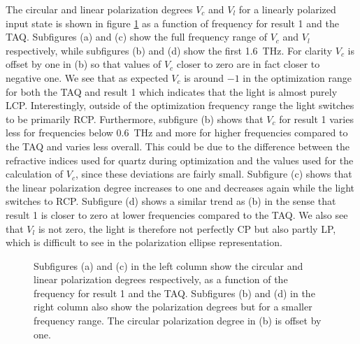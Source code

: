 The circular and linear polarization degrees $V_c$ and $V_l$ for a linearly polarized input state is shown in figure \ref{fig:cl4_pol_deg} as a function of frequency for result 1 and the TAQ. Subfigures (a) and (c) show the full frequency range of $V_c$ and $V_l$ respectively, while subfigures (b) and (d) show the first \SI{1.6}{\tera \hertz}. For clarity $V_c$ is offset by one in (b) so that values of $V_c$ closer to zero are in fact closer to negative one. We see that as expected $V_c$ is around $-1$ in the optimization range for both the TAQ and result 1 which indicates that the light is almost purely LCP. Interestingly, outside of the optimization frequency range the light switches to be primarily RCP. Furthermore, subfigure (b) shows that $V_c$ for result 1 varies less for frequencies below \SI{0.6}{\tera \hertz} and more for higher frequencies compared to the TAQ and varies less overall. This could be due to the difference between the refractive indices used for quartz during optimization and the values used for the calculation of $V_c$, since these deviations are fairly small. Subfigure (c) shows that the linear polarization degree increases to one and decreases again while the light switches to RCP. Subfigure (d) shows a similar trend as (b) in the sense that result 1 is closer to zero at lower frequencies compared to the TAQ. We also see that $V_l$ is not zero, the light is therefore not perfectly CP but also partly LP, which is difficult to see in the polarization ellipse representation. 

\begin{figure}[H]
\centering
\subcaptionbox{\label{fig:cl4_pol_deg_a}}
    {\hspace*{-2em}}
\qquad
\subcaptionbox{\label{fig:cl4_pol_deg_b}}
    {\hspace*{-2em}}

\subcaptionbox{\label{fig:cl4_pol_deg_c}}
    {\hspace*{-2em}}
\qquad
\subcaptionbox{\label{fig:cl4_pol_deg_d}}
    {\hspace*{-2em}}
\caption{Subfigures (a) and (c) in the left column show the circular and linear polarization degrees respectively, as a function of the frequency for result 1 and the TAQ. Subfigures (b) and (d) in the right column also show the polarization degrees but for a smaller frequency range. The circular polarization degree in (b) is offset by one.}
\label{fig:cl4_pol_deg}
\end{figure}

